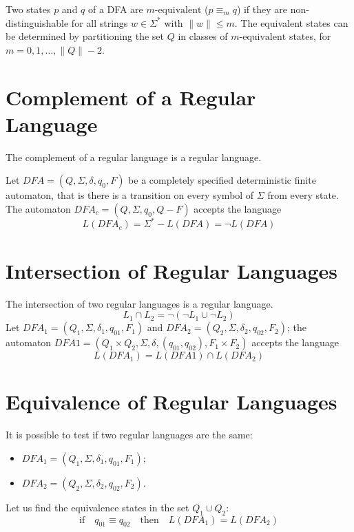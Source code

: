 Two states $p$ and $q$ of a DFA are $m\text{-equivalent}$ ($p \equiv_m q$) if they are non-distinguishable for all strings $w \in \Sigma^\ast$ with $\|w\| \leq m$.
The equivalent states can be determined by partitioning the set $Q$ in classes of $m\text{-equivalent}$ states, for $m = 0, 1, \ldots, \|Q\| - 2$.

\section{Complement of a Regular Language}
The complement of a regular language is a regular language.

Let $DFA = (Q, \Sigma, \delta, q_0, F)$ be a completely specified deterministic finite automaton, that is there is a transition on every symbol of $\Sigma$ from every state.
The automaton $DFA_c = (Q, \Sigma, q_0, Q - F)$ accepts the language
$$
    L(DFA_c) = \Sigma^\ast - L(DFA) = \neg L(DFA)
$$

\section{Intersection of Regular Languages}
The intersection of two regular languages is a regular language.
$$
    L_1 \cap L_2 = \neg (\neg L_1 \cup \neg L_2)
$$
Let $DFA_1 = (Q_1, \Sigma, \delta_1, q_{01}, F_1)$ and $DFA_2 = (Q_2, \Sigma, \delta_2, q_{02}, F_2)$; the automaton $DFA1 = (Q_1 \times Q_2, \Sigma, \delta, (q_{01}, q_{02}), F_1 \times F_2)$ accepts the language
$$
    L(DFA_1) = L(DFA1) \cap L(DFA_2)
$$

\section{Equivalence of Regular Languages}
It is possible to test if two regular languages are the same:
\begin{itemize}
    \item $DFA_1 = (Q_1, \Sigma, \delta_1, q_{01}, F_1)$;
    \item $DFA_2 = (Q_2, \Sigma, \delta_2, q_{02}, F_2)$.
\end{itemize}
Let us find the equivalence states in the set $Q_1 \cup Q_2$:
$$
    \text{if} \quad q_{01} \equiv q_{02} \quad \text{then} \quad L(DFA_1) = L(DFA_2)
$$